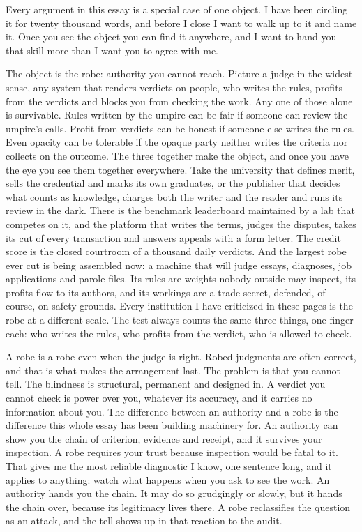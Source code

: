 \documentclass[11pt]{article}
\begin{document}
Every argument in this essay is a special case of one object. I have been circling it for twenty thousand words, and before I close I want to walk up to it and name it. Once you see the object you can find it anywhere, and I want to hand you that skill more than I want you to agree with me.

The object is the robe: authority you cannot reach. Picture a judge in the widest sense, any system that renders verdicts on people, who writes the rules, profits from the verdicts and blocks you from checking the work. Any one of those alone is survivable. Rules written by the umpire can be fair if someone can review the umpire's calls. Profit from verdicts can be honest if someone else writes the rules. Even opacity can be tolerable if the opaque party neither writes the criteria nor collects on the outcome. The three together make the object, and once you have the eye you see them together everywhere. Take the university that defines merit, sells the credential and marks its own graduates, or the publisher that decides what counts as knowledge, charges both the writer and the reader and runs its review in the dark. There is the benchmark leaderboard maintained by a lab that competes on it, and the platform that writes the terms, judges the disputes, takes its cut of every transaction and answers appeals with a form letter. The credit score is the closed courtroom of a thousand daily verdicts. And the largest robe ever cut is being assembled now: a machine that will judge essays, diagnoses, job applications and parole files. Its rules are weights nobody outside may inspect, its profits flow to its authors, and its workings are a trade secret, defended, of course, on safety grounds. Every institution I have criticized in these pages is the robe at a different scale. The test always counts the same three things, one finger each: who writes the rules, who profits from the verdict, who is allowed to check.

A robe is a robe even when the judge is right. Robed judgments are often correct, and that is what makes the arrangement last. The problem is that you cannot tell. The blindness is structural, permanent and designed in. A verdict you cannot check is power over you, whatever its accuracy, and it carries no information about you. The difference between an authority and a robe is the difference this whole essay has been building machinery for. An authority can show you the chain of criterion, evidence and receipt, and it survives your inspection. A robe requires your trust because inspection would be fatal to it. That gives me the most reliable diagnostic I know, one sentence long, and it applies to anything: watch what happens when you ask to see the work. An authority hands you the chain. It may do so grudgingly or slowly, but it hands the chain over, because its legitimacy lives there. A robe reclassifies the question as an attack, and the tell shows up in that reaction to the audit.
\end{document}
